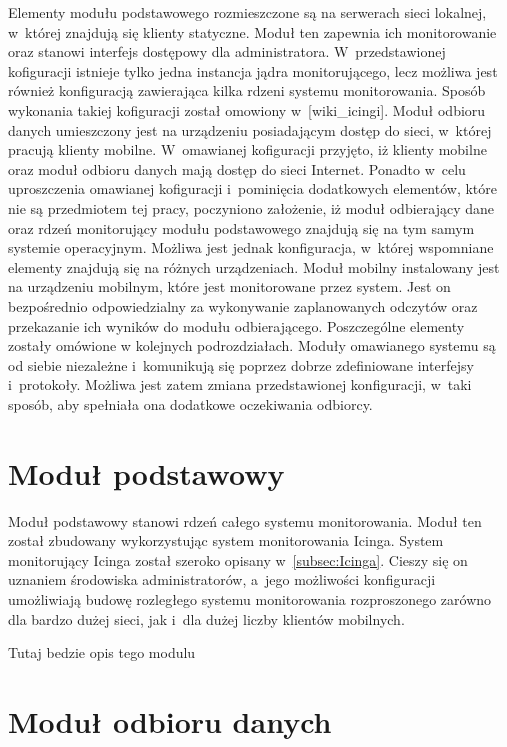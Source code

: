 Elementy modułu podstawowego rozmieszczone są na serwerach sieci
lokalnej, w~której znajdują się klienty statyczne. Moduł ten zapewnia
ich monitorowanie oraz stanowi interfejs dostępowy dla
administratora. W~przedstawionej kofiguracji istnieje tylko jedna
instancja jądra monitorującego, lecz możliwa jest również konfiguracją
zawierająca kilka rdzeni systemu monitorowania. Sposób wykonania
takiej kofiguracji został omowiony w~[wiki\_icingi]. Moduł odbioru
danych umieszczony jest na urządzeniu posiadającym dostęp do sieci,
w~której pracują klienty mobilne. W~omawianej kofiguracji przyjęto, iż
klienty mobilne oraz moduł odbioru danych mają dostęp do sieci
Internet. Ponadto w~celu uproszczenia omawianej kofiguracji
i~pominięcia dodatkowych elementów, które nie są przedmiotem tej
pracy, poczyniono założenie, iż moduł odbierający dane oraz rdzeń
monitorujący modułu podstawowego znajdują się na tym samym systemie
operacyjnym. Możliwa jest jednak konfiguracja, w~której wspomniane
elementy znajdują się na różnych urządzeniach. Moduł mobilny
instalowany jest na urządzeniu mobilnym, które jest monitorowane przez
system. Jest on bezpośrednio odpowiedzialny za wykonywanie
zaplanowanych odczytów oraz przekazanie ich wyników do modułu
odbierającego. Poszczególne elementy zostały omówione w kolejnych
podrozdziałach. Moduły omawianego systemu są od siebie niezależne
i~komunikują się poprzez dobrze zdefiniowane interfejsy
i~protokoły. Możliwa jest zatem zmiana przedstawionej konfiguracji,
w~taki sposób, aby spełniała ona dodatkowe oczekiwania odbiorcy.

\section[Moduł podstawowy][Moduł podstawowy]{Moduł podstawowy}

Moduł podstawowy stanowi rdzeń całego systemu monitorowania. Moduł ten
został zbudowany wykorzystując system monitorowania Icinga. System
monitorujący Icinga został szeroko opisany
w~\ref{subsec:Icinga}. Cieszy się on uznaniem środowiska
administratorów, a~jego możliwości konfiguracji umożliwiają budowę
rozległego systemu monitorowania rozproszonego zarówno dla bardzo
dużej sieci, jak i~dla dużej liczby klientów mobilnych.

Tutaj bedzie opis tego modulu

\section[Moduł odbioru danych][Moduł odbioru danych]{Moduł odbioru danych}
\label{sec:ModOdbDanych}

